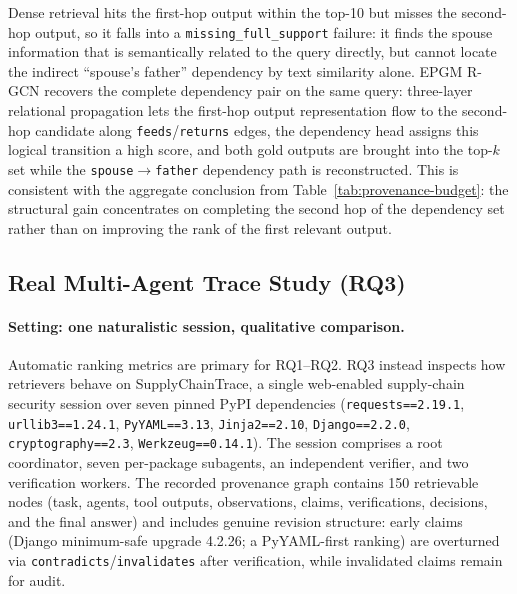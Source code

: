 Dense retrieval hits the first-hop output within the top-10 but misses the
second-hop output, so it falls into a \texttt{missing\_full\_support}
failure: it finds the spouse information that is semantically related to
the query directly, but cannot locate the indirect ``spouse's father''
dependency by text similarity alone. EPGM R-GCN recovers the complete
dependency pair on the same query: three-layer relational propagation lets
the first-hop output representation flow to the second-hop candidate along
\texttt{feeds}/\texttt{returns} edges, the dependency head assigns this
logical transition a high score, and both gold outputs are brought into the
top-$k$ set while the \texttt{spouse}$\rightarrow$\texttt{father}
dependency path is reconstructed. This is consistent with the aggregate
conclusion from Table~\ref{tab:provenance-budget}: the structural gain
concentrates on completing the second hop of the dependency set rather
than on improving the rank of the first relevant output.


\subsection{Real Multi-Agent Trace Study (RQ3)}

\paragraph{Setting: one naturalistic session, qualitative comparison.}
Automatic ranking metrics are primary for RQ1--RQ2. RQ3 instead inspects
how retrievers behave on SupplyChainTrace, a single web-enabled
supply-chain security session over seven pinned PyPI dependencies
(\texttt{requests==2.19.1}, \texttt{urllib3==1.24.1},
\texttt{PyYAML==3.13}, \texttt{Jinja2==2.10}, \texttt{Django==2.2.0},
\texttt{cryptography==2.3}, \texttt{Werkzeug==0.14.1}).
The session comprises a root coordinator, seven per-package subagents,
an independent verifier, and two verification workers. The recorded
provenance graph contains 150 retrievable nodes (task, agents, tool outputs,
observations, claims, verifications, decisions, and the final answer)
and includes genuine revision structure: early claims (Django
minimum-safe upgrade 4.2.26; a PyYAML-first ranking) are overturned via
\texttt{contradicts}/\texttt{invalidates} after verification, while
invalidated claims remain for audit.

